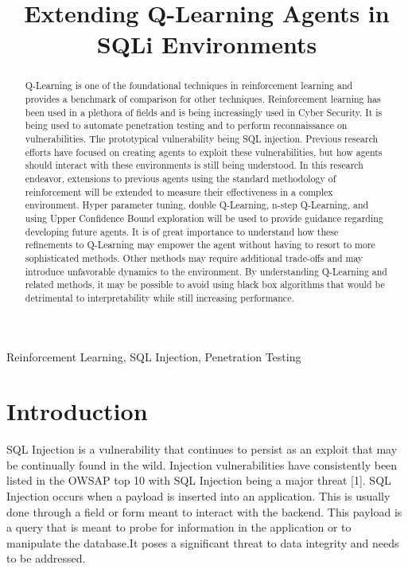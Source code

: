 \documentclass[conference]{IEEEtran}
\begin{document}
\title{Extending Q-Learning Agents in SQLi Environments}

\author{
}

\maketitle

\begin{abstract}
Q-Learning is one of the foundational techniques in reinforcement learning and provides a benchmark of comparison for other techniques. Reinforcement learning has been used in a plethora of fields and is being increasingly used in Cyber Security. It is being used to automate penetration testing and to perform reconnaissance on vulnerabilities.  The prototypical vulnerability being SQL injection. Previous research efforts have focused on creating agents to exploit these vulnerabilities, but how agents should interact with these environments is still being understood. In this research endeavor, extensions to previous agents using the standard methodology of reinforcement will be extended to measure their effectiveness in a complex environment. Hyper parameter tuning, double Q-Learning, n-step Q-Learning, and using Upper Confidence Bound exploration will be used to provide guidance regarding developing future agents. It is of great importance to understand how these refinements to Q-Learning may empower the agent without having to resort to more sophisticated methods. Other methods may require additional trade-offs and may introduce unfavorable dynamics to the environment. By understanding Q-Learning and related methods, it may be possible to avoid using black box algorithms that would be detrimental to interpretability while still increasing performance.  
\end{abstract}

\begin{IEEEkeywords}
Reinforcement Learning, SQL Injection, Penetration Testing 
\end{IEEEkeywords}

\section{Introduction}
SQL Injection is a vulnerability that continues to persist as an exploit that may be continually found in the wild. Injection vulnerabilities have consistently been listed in the OWSAP top 10 with SQL Injection being a major threat [1]. SQL Injection occurs when a payload is inserted into an application. This is usually done through a field or form meant to interact with the backend. This payload is a query that is meant to probe for information in the application or to manipulate the database.It poses a significant threat to data integrity and needs to be  addressed. 
\end{document}
